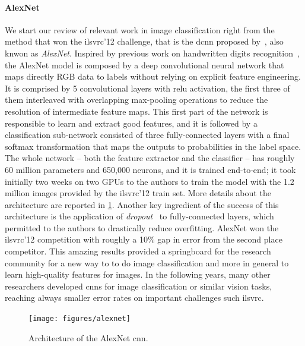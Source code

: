 \paragraph{AlexNet}
We start our review of relevant work in image classification right from the method that won the \gls{ilsvrc}'12 challenge, that is the \gls{dcnn} proposed by~\citet{krizhevsky2012imagenet}, also knwon as \emph{AlexNet}.
Inspired by previous work on handwritten digits recognition~\cite{lecun1989backpropagation}, the AlexNet model is composed by a deep convolutional neural network that maps directly RGB data to labels without relying on explicit feature engineering.
It is comprised by 5 convolutional layers with \gls{relu} activation, the first three of them interleaved with overlapping max-pooling operations to reduce the resolution of intermediate feature maps.
This first part of the network is responsible to learn and extract good features, and it is followed by a classification sub-network consisted of three fully-connected layers with a final softmax transformation that maps the outputs to probabilities in the label space.
The whole network -- both the feature extractor and the classifier -- has roughly 60 million parameters and 650,000 neurons, and it is trained end-to-end;
it took initially two weeks on two GPUs to the authors to train the model with the 1.2 million images provided by the \gls{ilsvrc}'12 train set.
More details about the architecture are reported in \ref{fig:back:alexnet}.
Another key ingredient of the success of this architecture is the application of \emph{dropout}~\cite{hinton2012improving} to fully-connected layers, which permitted to the authors to drastically reduce overfitting.
AlexNet won the \gls{ilsvrc}'12 competition with roughly a 10\% gap in error from the second place competitor.
This amazing results provided a springboard for the research community for a new way to to do image classification and more in general to learn high-quality features for images.
In the following years, many other researchers developed \glspl{cnn} for image classification or similar vision tasks, reaching always smaller error rates on important challenges such \gls{ilsvrc}.

\begin{figure}
    \centering
    \texttt{[image: figures/alexnet]}
    \caption{Architecture of the AlexNet \gls{cnn}.}
    \label{fig:back:alexnet}
\end{figure}

